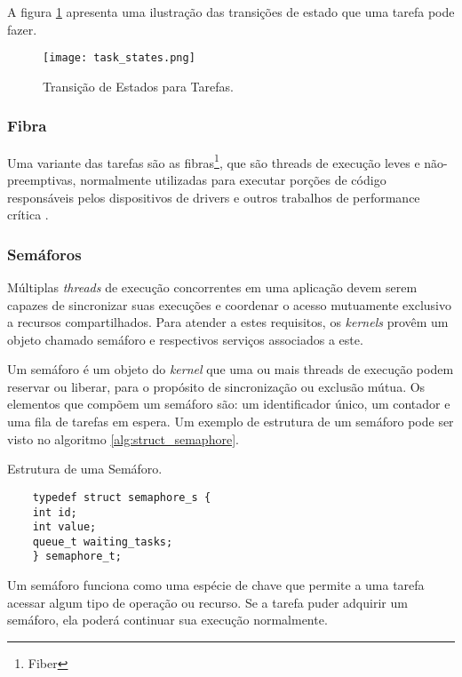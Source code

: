 A figura \ref{fig:tarefa_estados} apresenta uma ilustração das transições de estado que uma tarefa pode fazer.

\begin{figure}[htb]
	\centering
	\texttt{[image: task\_states.png]}
	\caption{Transição de Estados para Tarefas.}
	\label{fig:tarefa_estados}
\end{figure}

\subsubsection{Fibra}

Uma variante das tarefas são as fibras\footnote{Fiber}, que são threads de execução leves e não-preemptivas, normalmente utilizadas para executar porções de código responsáveis pelos dispositivos de drivers e outros trabalhos de performance crítica \cite{rocket}.

\subsubsection{Semáforos}

Múltiplas \emph{threads} de execução concorrentes em uma aplicação devem serem capazes de sincronizar suas execuções e coordenar o acesso mutuamente exclusivo a recursos compartilhados. Para atender a estes requisitos, os \emph{kernels} provêm um objeto chamado semáforo e respectivos serviços associados a este.

Um semáforo é um objeto do \emph{kernel} que uma ou mais threads de execução podem reservar ou liberar, para o propósito de sincronização ou exclusão mútua. Os elementos que compõem um semáforo são: um identificador único, um contador e uma fila de tarefas em espera. Um exemplo de estrutura de um semáforo pode ser visto no algoritmo \ref{alg:struct_semaphore}.

\begin{listing}
	\label{alg:struct_semaphore}
	\caption{Estrutura de uma Semáforo.}
	\centering
	\begin{verbatim}
	typedef struct semaphore_s {
	int id;
	int value;
	queue_t waiting_tasks;
	} semaphore_t;
	\end{verbatim}
\end{listing}

Um semáforo funciona como uma espécie de chave que permite a uma tarefa acessar algum tipo de operação ou recurso. Se a tarefa puder adquirir um semáforo, ela poderá continuar sua execução normalmente.

